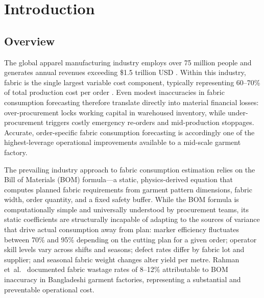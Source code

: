 \chapter{Introduction}
\label{ch:intro}
\sloppy
{}

\section{Overview}
The global apparel manufacturing industry employs over 75 million people and generates annual revenues exceeding \$1.5 trillion USD \cite{world2023textile}. Within this industry, fabric is the single largest variable cost component, typically representing 60--70\% of total production cost per order \cite{rahman2018fabric}. Even modest inaccuracies in fabric consumption forecasting therefore translate directly into material financial losses: over-procurement locks working capital in warehoused inventory, while under-procurement triggers costly emergency re-orders and mid-production stoppages. Accurate, order-specific fabric consumption forecasting is accordingly one of the highest-leverage operational improvements available to a mid-scale garment factory.

The prevailing industry approach to fabric consumption estimation relies on the Bill of Materials (BOM) formula---a static, physics-derived equation that computes planned fabric requirements from garment pattern dimensions, fabric width, order quantity, and a fixed safety buffer. While the BOM formula is computationally simple and universally understood by procurement teams, its static coefficients are structurally incapable of adapting to the sources of variance that drive actual consumption away from plan: marker efficiency fluctuates between 70\% and 95\% depending on the cutting plan for a given order; operator skill levels vary across shifts and seasons; defect rates differ by fabric lot and supplier; and seasonal fabric weight changes alter yield per metre. Rahman et~al.\ \cite{rahman2018fabric} documented fabric wastage rates of 8--12\% attributable to BOM inaccuracy in Bangladeshi garment factories, representing a substantial and preventable operational cost.

